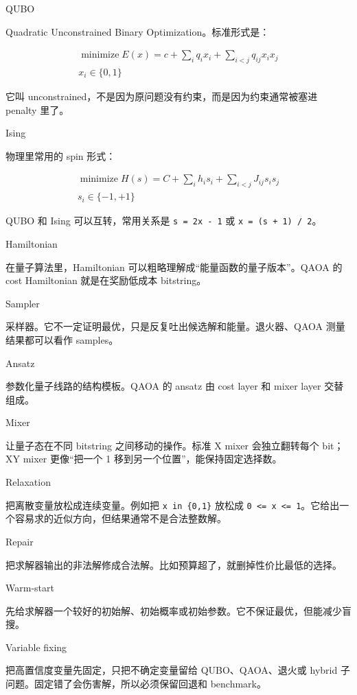 \documentclass[UTF8,12pt,a4paper]{ctexart}
\begin{document}
QUBO

Quadratic Unconstrained Binary Optimization。标准形式是：

\[
\begin{aligned}
\operatorname*{minimize} E(x) = c + \sum_{i} q_{i} x_{i} + \sum_{i<j} q_{ij} x_{i} x_{j}\\
x_{i} \in \{0, 1\}
\end{aligned}
\]

它叫 unconstrained，不是因为原问题没有约束，而是因为约束通常被塞进 penalty 里了。

Ising

物理里常用的 spin 形式：

\[
\begin{aligned}
\operatorname*{minimize} H(s) = C + \sum_{i} h_{i} s_{i} + \sum_{i<j} J_{ij} s_{i} s_{j}\\
s_{i} \in \{-1, +1\}
\end{aligned}
\]

QUBO 和 Ising 可以互转，常用关系是 \texttt{s = 2x - 1} 或 \texttt{x = (s + 1) / 2}。

Hamiltonian

在量子算法里，Hamiltonian 可以粗略理解成“能量函数的量子版本”。QAOA 的 cost Hamiltonian 就是在奖励低成本 bitstring。

Sampler

采样器。它不一定证明最优，只是反复吐出候选解和能量。退火器、QAOA 测量结果都可以看作 samples。

Ansatz

参数化量子线路的结构模板。QAOA 的 ansatz 由 cost layer 和 mixer layer 交替组成。

Mixer

让量子态在不同 bitstring 之间移动的操作。标准 X mixer 会独立翻转每个 bit；XY mixer 更像“把一个 1 移到另一个位置”，能保持固定选择数。

Relaxation

把离散变量放松成连续变量。例如把 \texttt{x in \{0,1\}} 放松成 \texttt{0 <= x <= 1}。它给出一个容易求的近似方向，但结果通常不是合法整数解。

Repair

把求解器输出的非法解修成合法解。比如预算超了，就删掉性价比最低的选择。

Warm-start

先给求解器一个较好的初始解、初始概率或初始参数。它不保证最优，但能减少盲搜。

Variable fixing

把高置信度变量先固定，只把不确定变量留给 QUBO、QAOA、退火或 hybrid 子问题。固定错了会伤害解，所以必须保留回退和 benchmark。
\end{document}
